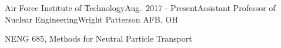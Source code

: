 \begin{rSubsection}{Air Force Institute of Technology}{Aug.\ 2017 - Present}{Assistant Professor of Nuclear Engineering}{Wright Patterson AFB, OH}
\item NENG 685, Methods for Neutral Particle Transport 
\end{rSubsection}


